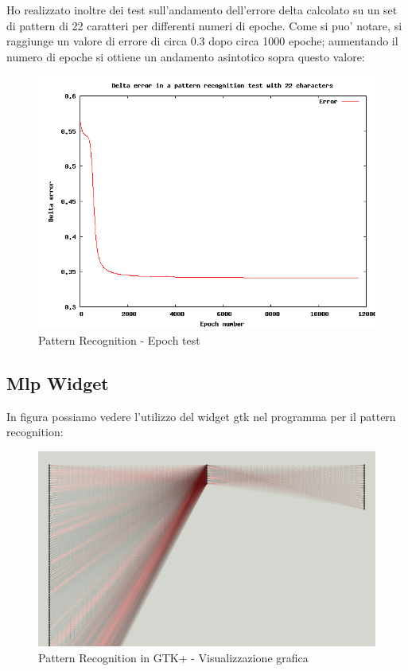 \documentclass[a4paper,10pt]{report}
\begin{document}
\newpage
Ho realizzato inoltre dei test sull'andamento dell'errore delta calcolato su
un set di pattern di 22 caratteri per differenti numeri di epoche. Come si
puo' notare, si raggiunge un valore di errore di circa 0.3 dopo circa 1000 epoche;
aumentando il numero di epoche si ottiene un andamento asintotico sopra questo valore:

\begin{figure}[!ht]
	\begin{center}	
		\includegraphics[scale=0.5]{img/stat/epoch_pattern.png}
		\caption{Pattern Recognition - Epoch test}
		\label{fig: Pattern Recognition - Test delle epoche}
	\end{center}
\end{figure}



\newpage
\subsection{Mlp Widget}
In figura possiamo vedere l'utilizzo del widget gtk nel programma
per il pattern recognition:

\begin{figure}[!ht]
	\begin{center}	
		\includegraphics[scale=0.5]{img/screen/cairoshow.png}
		\caption{Pattern Recognition in GTK+ - Visualizzazione grafica}
		\label{fig: Programma di Pattern Recognition in GTK+ - Visualizzazione}
	\end{center}
\end{figure}
\end{document}
